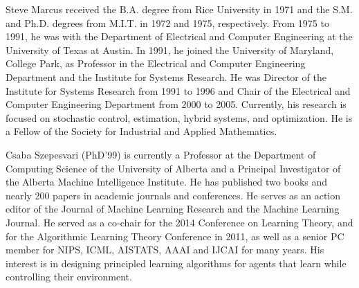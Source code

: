 \documentclass[twocolumn]{IEEEtran}
\begin{document}
\vspace{-3ex}

\begin{IEEEbiographynophoto}{Steve Marcus}
received the B.A. degree from Rice University in 1971 and the S.M. and Ph.D. degrees from M.I.T. in 1972 and 1975, respectively.  From 1975 to 1991, he was with the Department of Electrical and Computer Engineering at the University of Texas at Austin.  In 1991, he joined the University of Maryland, College Park, as Professor in the Electrical and Computer Engineering Department and the Institute for Systems Research.  He was Director of the Institute for Systems Research from 1991 to 1996 and Chair of the Electrical and Computer Engineering Department from 2000 to 2005.  Currently, his research is focused on stochastic control, estimation, hybrid systems, and optimization.  He is a Fellow of the Society for Industrial and Applied Mathematics.
\end{IEEEbiographynophoto}

\vspace{-3ex}

\begin{IEEEbiographynophoto}{Csaba Szepesvari}
(PhD'99) is currently a Professor at the Department of
Computing Science of the University of Alberta and a Principal
Investigator of the Alberta Machine Intelligence Institute. He has published two books and nearly 200 papers in academic
journals and conferences. 
He serves as an action editor of the Journal of Machine
Learning Research and the Machine Learning Journal. He served as a
co-chair for the 2014 Conference on Learning Theory, and for the
Algorithmic Learning Theory Conference in 2011, as well as a senior PC
member for NIPS, ICML, AISTATS, AAAI and IJCAI for many years. His
interest is in designing principled learning algorithms for agents that
learn while controlling their environment.
\end{IEEEbiographynophoto}
\end{document}
